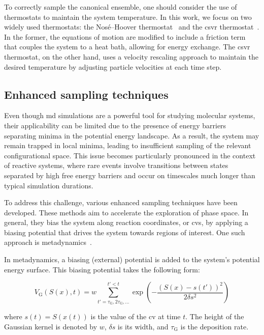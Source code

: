 To correctly sample the canonical ensemble, one should consider the use of thermostats to maintain the system temperature. In this work, we focus on two widely used thermostats: the Nos\'e--Hoover thermostat~\citep{noseUnifiedFormulationConstant1984, hooverCanonicalDynamicsEquilibrium1985} and the \ac{csvr} thermostat~\citep{bussiCanonicalSamplingVelocity2007}. In the former, the equations of motion are modified to include a friction term that couples the system to a heat bath, allowing for energy exchange. The \ac{csvr} thermostat, on the other hand, uses a velocity rescaling approach to maintain the desired temperature by adjusting particle velocities at each time step.



\subsection{Enhanced sampling techniques}
Even though \ac{md} simulations are a powerful tool for studying molecular systems, their applicability can be limited due to the presence of energy barriers separating minima in the potential energy landscape. As a result, the system may remain trapped in local minima, leading to insufficient sampling of the relevant configurational space. This issue becomes particularly pronounced in the context of reactive systems, where rare events involve transitions between states separated by high free energy barriers and occur on timescales much longer than typical simulation durations.

To address this challenge, various enhanced sampling techniques have been developed. These methods aim to accelerate the exploration of phase space. In general, they bias the system along reaction coordinates, or \acp{cv}, by applying a biasing potential that drives the system towards regions of interest. One such approach is metadynamics~\citep{laioEscapingFreeenergyMinima2002, laioMetadynamicsMethodSimulate2008}.

In metadynamics, a biasing (external) potential is added to the system's potential energy surface. This biasing potential takes the following form:

\begin{equation}
    V_{\text{G}}(S(x), t) = w \sum_{t' = \tau_{\text{G}}, 2\tau_{\text{G}}, \ldots}^{t' < t} \exp\left(-\frac{(S(x) - s(t'))^2}{2\delta s^2}\right)
    \label{eq:biasing_potential}
\end{equation}

where $s(t) = S(x(t))$ is the value of the \ac{cv} at time $t$. The height of the Gaussian kernel is denoted by $w$, $\delta s$ is its width, and $\tau_{\text{G}}$ is the deposition rate.

